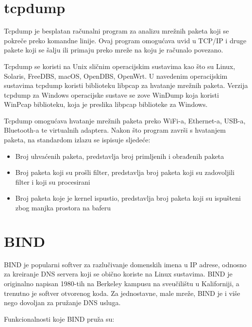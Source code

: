 \documentclass[12pt, oneside, onecolumn]{book}
\begin{document}
{\section{tcpdump}
Tcpdump je besplatan računalni program za analizu mrežnih paketa koji se pokreče preko komandne linije. Ovaj program omogućava uvid u TCP/IP i druge pakete koji se šalju ili primaju preko mreže na koju je računalo povezano.

Tcpdump se koristi na Unix sličnim operacijskim sustavima kao što su Linux, Solaris, FreeDBS, macOS, OpenDBS, OpenWrt. U navedenim operacijskim sustavima tcpdump koristi biblioteku libpcap za hvatanje mrežnih paketa. Verzija tcpdump za Windows operacijske sustave se zove WinDump koja koristi WinPcap biblioteku, koja je preslika libpcap biblioteke za Windows.

\pagebreak

Tcpdump omogućava hvatanje mrežnih paketa preko WiFi-a, Ethernet-a, USB-a, Bluetooth-a te virtualnih adaptera. Nakon što program završi s hvatanjem paketa, na standardom izlazu se ispisuje sljedeće: \cite{tpdump}

\begin{itemize}
\item Broj uhvaćenih paketa, predstavlja broj primljenih i obrađenih paketa
\item Broj paketa koji su prošli filter, predstavlja broj paketa koji su zadovoljili filter i koji su procesirani
\item Broj paketa koje je kernel ispustio, predstavlja broj paketa koji su ispušteni zbog manjka prostora na baferu
\end{itemize}

\section{BIND}
BIND je popularni softver za razlučivanje domenskih imena u IP adrese, odnosno za kreiranje DNS servera koji se obično koriste na Linux sustavima. BIND je originalno napisan 1980-tih na Berkeley kampusu na sveučilištu u Kaliforniji, a trenutno je softver otvorenog koda. Za jednostavne, male mreže, BIND je i više nego dovoljan za pružanje DNS usluga.

Funkcionalnosti koje BIND pruža su: \cite{bind}

}
\end{document}
